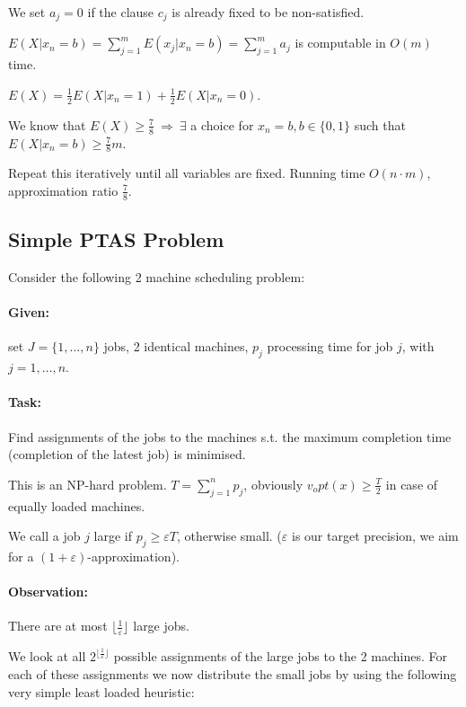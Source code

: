 \documentclass[11pt]{article}
\theoremstyle{definition}
\theoremstyle{definition}
\begin{document}
We set $ a_j = 0 $ if the clause $ c_j $ is already fixed to be non-satisfied.

$ E (X | x_n = b) = \sum \limits_{j = 1}^m E (x_j | x_n = b) = \sum \limits_{j = 1}^m a_j $ is computable in $ O(m) $ time.

$ E(X) = \frac{1}{2} E(X | x_n = 1) + \frac{1}{2} E(X | x_n = 0) $.

We know that $ E(X) \geq \frac{7}{8} ~ \Rightarrow ~ \exists $ a choice for $ x_n = b, b \in \{0, 1\} $ such that $ E(X | x_n = b) \geq \frac{7}{8} m $.

Repeat this iteratively until all variables are fixed. Running time $ O(n \cdot m ) $, approximation ratio $ \frac{7}{8} $.

\subsection{Simple PTAS Problem}

Consider the following 2 machine scheduling problem:

\paragraph{Given:} set $ J = \{1, \dots, n \} $ jobs, 2 identical machines, $ p_j $ processing time for job $ j $, with $ j = 1, \dots, n $.

\paragraph{Task:} Find assignments of the jobs to the machines s.t. the maximum completion time (completion of the latest job) is minimised.

This is an NP-hard problem. $ T = \sum \limits_{j = 1}^n p_j $, obviously $ v_opt(x) \geq \frac{T}{2}  $ in case of equally loaded machines.

We call a job $ j $ large if $ p_j \geq \varepsilon T $, otherwise small. ($ \varepsilon $ is our target precision, we aim for a $( 1 + \varepsilon) $-approximation).

\paragraph{Observation:} There are at most $ \lfloor \frac{1}{\varepsilon} \rfloor $ large jobs.

We look at all $ 2^{ \lfloor \frac{1}{\varepsilon} \rfloor} $ possible assignments of the large jobs to the 2 machines. For each of these assignments we now distribute the small jobs by using the following very simple least loaded heuristic:
\end{document}
